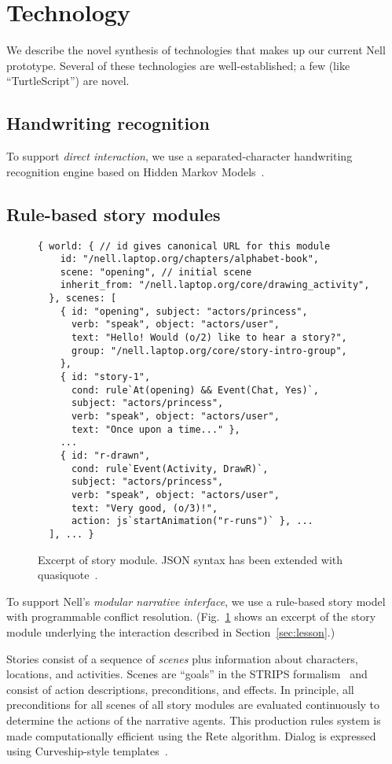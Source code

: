 \documentclass[preprint]{sig-alternate}
\begin{document}
\section{Technology}
We describe the novel synthesis of technologies that makes up our current Nell
prototype. Several of these technologies are well-established; a few (like
``TurtleScript'') are novel.

\subsection{Handwriting recognition}
To support \textit{direct interaction}, we use a separated-character
handwriting recognition engine based on Hidden Markov Models~\cite{hanshu:handwriting}.

\subsection{Rule-based story modules}
\begin{figure}\small
\begin{verbatim}
{ world: { // id gives canonical URL for this module
    id: "/nell.laptop.org/chapters/alphabet-book",
    scene: "opening", // initial scene
    inherit_from: "/nell.laptop.org/core/drawing_activity",
  }, scenes: [
    { id: "opening", subject: "actors/princess",
      verb: "speak", object: "actors/user",
      text: "Hello! Would (o/2) like to hear a story?",
      group: "/nell.laptop.org/core/story-intro-group",
    },
    { id: "story-1",
      cond: rule`At(opening) && Event(Chat, Yes)`,
      subject: "actors/princess",
      verb: "speak", object: "actors/user",
      text: "Once upon a time..." },
    ...
    { id: "r-drawn",
      cond: rule`Event(Activity, DrawR)`,
      subject: "actors/princess",
      verb: "speak", object: "actors/user",
      text: "Very good, (o/3)!",
      action: js`startAnimation("r-runs")` }, ...
  ], ... }
\end{verbatim}
\caption{Excerpt of story module.  JSON syntax has been extended with
quasiquote~\cite{quasiquote}.}\label{fig:rules}
\end{figure}
To support Nell's \textit{modular narrative interface}, we use a rule-based
story model with programmable conflict resolution. (Fig.~\ref{fig:rules} shows
an excerpt of the story module underlying the interaction described in
Section~\ref{sec:lesson}.)

Stories consist of a sequence of \textit{scenes} plus information about
characters, locations, and activities.  Scenes are ``goals''
in the STRIPS formalism~\cite{strips} and consist of
action descriptions, preconditions, and effects.
In principle, all preconditions for all scenes of all story modules
are evaluated continuously to determine the actions of the narrative
agents.  This production rules system
is made computationally efficient using the Rete
algorithm.  Dialog is expressed using Curveship-style
templates~\cite{montfort:curveship}.
\end{document}
